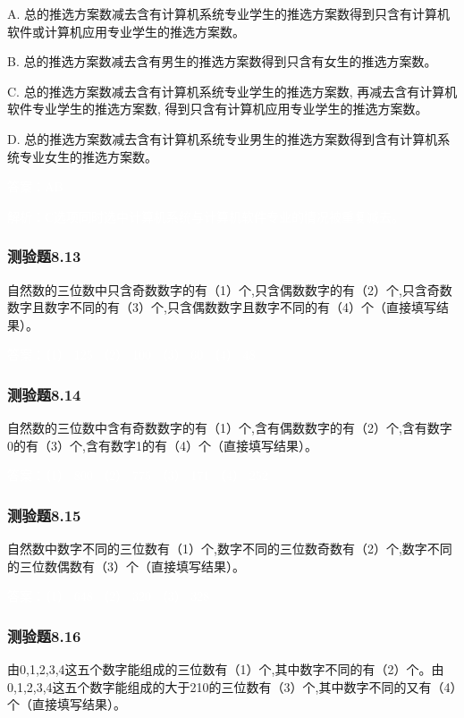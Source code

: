 \documentclass[UTF8, heading=true]{ctexart}
\begin{document}
A. 总的推选方案数减去含有计算机系统专业学生的推选方案数得到只含有计算机软件或计算机应用专业学生的推选方案数。

B. 总的推选方案数减去含有男生的推选方案数得到只含有女生的推选方案数。

C. 总的推选方案数减去含有计算机系统专业学生的推选方案数, 再减去含有计算机软件专业学生的推选方案数, 得到只含有计算机应用专业学生的推选方案数。

D. 总的推选方案数减去含有计算机系统专业男生的推选方案数得到含有计算机系统专业女生的推选方案数。

\textcolor{white}{答案：AB}

\textcolor{white}{解析：C选项同时选中计算机系统与计算机软件专业的情况被重复减去。}

\subsubsection{测验题8.13}

自然数的三位数中只含奇数数字的有（1）个,只含偶数数字的有（2）个,只含奇数数字且数字不同的有（3）个,只含偶数数字且数字不同的有（4）个（直接填写结果）。

\textcolor{white}{答案：（1） 125 （2） 100 （3） 60 （4） 48}


\subsubsection{测验题8.14}
自然数的三位数中含有奇数数字的有（1）个,含有偶数数字的有（2）个,含有数字0的有（3）个,含有数字1的有（4）个（直接填写结果）。

\textcolor{white}{答案：（1） 800 （2） 775 （3） 171 （4） 252}

\subsubsection{测验题8.15}

自然数中数字不同的三位数有（1）个,数字不同的三位数奇数有（2）个,数字不同的三位数偶数有（3）个（直接填写结果）。

\textcolor{white}{答案：（1） 648 （2） 320 （3） 328}

\subsubsection{测验题8.16}

由0,1,2,3,4这五个数字能组成的三位数有（1）个,其中数字不同的有（2）个。由0,1,2,3,4这五个数字能组成的大于210的三位数有（3）个,其中数字不同的又有（4）个（直接填写结果）。
\end{document}
